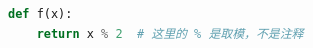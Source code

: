 \documentclass{article}
\begin{document}
\begin{lstlisting}[language=Python]
def f(x):
    return x % 2  # 这里的 % 是取模，不是注释
\end{lstlisting}
\end{document}

